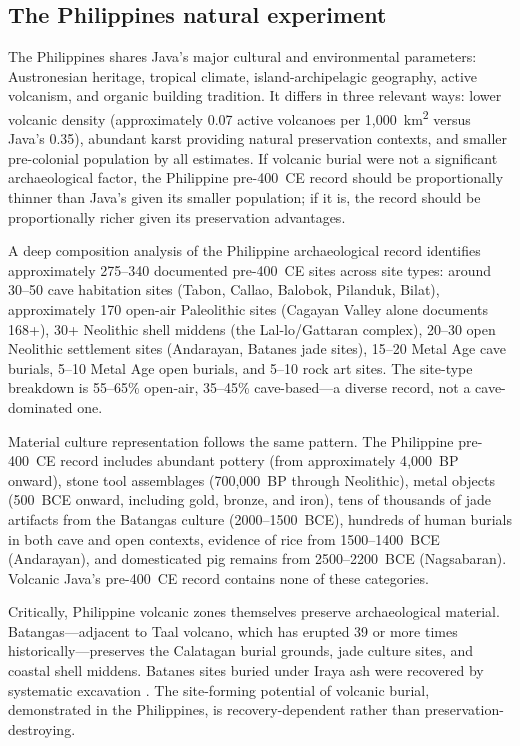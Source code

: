 \documentclass[12pt,a4paper]{article}
\begin{document}
\subsection{The Philippines natural experiment}
\label{sec:ch2}

The Philippines shares Java's major cultural and environmental parameters: Austronesian heritage, tropical climate, island-archipelagic geography, active volcanism, and organic building tradition. It differs in three relevant ways: lower volcanic density (approximately 0.07 active volcanoes per 1{,}000~km\textsuperscript{2} versus Java's 0.35), abundant karst providing natural preservation contexts, and smaller pre-colonial population by all estimates. If volcanic burial were not a significant archaeological factor, the Philippine pre-400~CE record should be proportionally thinner than Java's given its smaller population; if it is, the record should be proportionally richer given its preservation advantages.

A deep composition analysis of the Philippine archaeological record \citep[E201]{amien_e201} identifies approximately 275--340 documented pre-400~CE sites across site types: around 30--50 cave habitation sites (Tabon, Callao, Balobok, Pilanduk, Bilat), approximately 170 open-air Paleolithic sites (Cagayan Valley alone documents 168+), 30+ Neolithic shell middens (the Lal-lo/Gattaran complex), 20--30 open Neolithic settlement sites (Andarayan, Batanes jade sites), 15--20 Metal Age cave burials, 5--10 Metal Age open burials, and 5--10 rock art sites. The site-type breakdown is 55--65\% open-air, 35--45\% cave-based---a diverse record, not a cave-dominated one.

Material culture representation follows the same pattern. The Philippine pre-400~CE record includes abundant pottery (from approximately 4{,}000~BP onward), stone tool assemblages (700{,}000~BP through Neolithic), metal objects (500~BCE onward, including gold, bronze, and iron), tens of thousands of jade artifacts from the Batangas culture (2000--1500~BCE), hundreds of human burials in both cave and open contexts, evidence of rice from 1500--1400~BCE (Andarayan), and domesticated pig remains from 2500--2200~BCE (Nagsabaran). Volcanic Java's pre-400~CE record contains none of these categories.

Critically, Philippine volcanic zones themselves preserve archaeological material. Batangas---adjacent to Taal volcano, which has erupted 39 or more times historically---preserves the Calatagan burial grounds, jade culture sites, and coastal shell middens. Batanes sites buried under Iraya ash were recovered by systematic excavation \citep{bellwood_dizon2013}. The site-forming potential of volcanic burial, demonstrated in the Philippines, is recovery-dependent rather than preservation-destroying.
\end{document}
